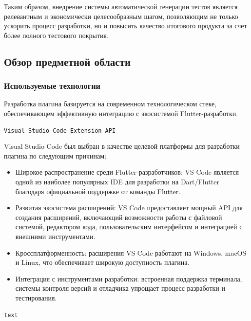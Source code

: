 \documentclass[14pt, russian]{scrartcl}
\begin{document}
Таким образом, внедрение системы автоматической генерации тестов является релевантным и экономически целесообразным шагом, позволяющим не только ускорить процесс разработки, но и повысить качество итогового продукта за счет более полного тестового покрытия.

\subsection{Обзор предметной области}

\subsubsection{Используемые технологии}

Разработка плагина базируется на современном технологическом стеке, обеспечивающем эффективную интеграцию с экосистемой Flutter-разработки.

\texttt{Visual Studio Code Extension API}

Visual Studio Code был выбран в качестве целевой платформы для разработки плагина по следующим причинам:
\begin{itemize}
    \item Широкое распространение среди Flutter-разработчиков: VS Code является одной из наиболее популярных IDE для разработки на Dart/Flutter благодаря официальной поддержке от команды Flutter.
    \item Развитая экосистема расширений: VS Code предоставляет мощный API для создания расширений, включающий возможности работы с файловой системой, редактором кода, пользовательским интерфейсом и интеграцией с внешними инструментами.
    \item Кроссплатформенность: расширения VS Code работают на Windows, macOS и Linux, что обеспечивает широкую доступность плагина.
    \item Интеграция с инструментами разработки: встроенная поддержка терминала, системы контроля версий и отладчика упрощает процесс разработки и тестирования.
\end{itemize}

\texttt{text}
\end{document}
